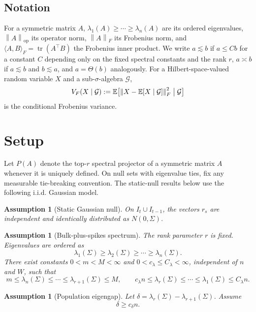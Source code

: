 \documentclass[11pt]{article}
\theoremstyle{tightplain}
\theoremstyle{tightdef}
\newtheorem{assumption}[theorem]{Assumption}
\DeclareMathOperator{\tr}{tr}
\DeclareMathOperator{\op}{op}
\newcommand{\E}{\mathbb E}
\newcommand{\norm}[1]{\left\lVert #1 \right\rVert}
\begin{document}
\subsection{Notation}

For a symmetric matrix $A$, $\lambda_1(A)\ge\cdots\ge\lambda_n(A)$ are its
ordered eigenvalues, $\norm{A}_{\op}$ its operator norm, $\norm{A}_F$ its
Frobenius norm, and $\langle A,B\rangle_F=\tr(A^\top B)$ the Frobenius inner
product. We write $a\lesssim b$ if $a\le Cb$ for a constant $C$ depending only
on the fixed spectral constants and the rank $r$, $a\asymp b$ if $a\lesssim b$
and $b\lesssim a$, and $a=\Theta(b)$ analogously. For a Hilbert-space-valued
random variable $X$ and a sub-$\sigma$-algebra $\mathcal G$,
\[
V_F(X\mid\mathcal G)
:=\E\bigl[\norm{X-\E[X\mid\mathcal G]}_F^2\bigm|\mathcal G\bigr]
\]
is the conditional Frobenius variance.

\section{Setup}\label{sec:setup}

Let $P(A)$ denote the top-$r$ spectral projector of a symmetric matrix $A$
whenever it is uniquely defined. On null sets with eigenvalue ties, fix any
measurable tie-breaking convention. The static-null results below use the
following i.i.d. Gaussian model.

\begin{assumption}[Static Gaussian null]\label{ass:gaussian}
On $I_t\cup I_{t-1}$, the vectors $r_s$ are independent and identically
distributed as $N(0,\Sigma)$.
\end{assumption}

\begin{assumption}[Bulk-plus-spikes spectrum]\label{ass:bulkspike}
The rank parameter $r$ is fixed. Eigenvalues are ordered as
\[
\lambda_1(\Sigma)\ge\lambda_2(\Sigma)\ge\cdots\ge\lambda_n(\Sigma).
\]
There exist constants $0<m<M<\infty$ and $0<c_\lambda\le C_\lambda<\infty$,
independent of $n$ and $W$, such that
\[
m\le \lambda_n(\Sigma)\le\cdots\le\lambda_{r+1}(\Sigma)\le M,
\qquad
c_\lambda n\le \lambda_r(\Sigma)\le\cdots\le\lambda_1(\Sigma)\le C_\lambda n.
\]
\end{assumption}

\begin{assumption}[Population eigengap]\label{ass:gap}
Let $\delta=\lambda_r(\Sigma)-\lambda_{r+1}(\Sigma)$. Assume
\[
\delta\ge c_\delta n.
\]
\end{assumption}
\end{document}
